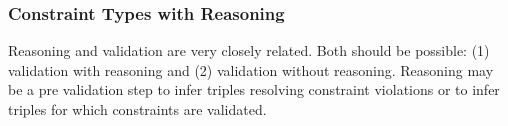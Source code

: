 \documentclass{llncs}
\newcommand{\ms}[1]{\texttt{#1}}
\begin{document}
\subsubsection{Constraint Types with Reasoning}
\label{sec:RDF-validation-requirements-and-reasoning}

Reasoning and validation are very closely related. 
Both should be possible: (1) validation with reasoning and (2) validation without reasoning. 
Reasoning may be a pre validation step to infer triples resolving constraint violations or to infer triples for which constraints are validated.

%
\end{document}
